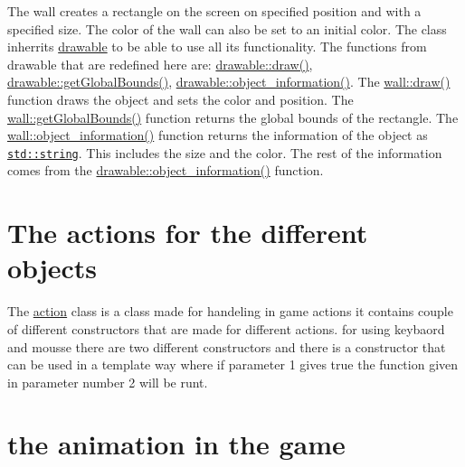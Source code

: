 The wall creates a rectangle on the screen on specified position and with a specified size. The color of the wall can also be set to an initial color. The class inherrits \hyperlink{classdrawable}{drawable} to be able to use all its functionality. The functions from drawable that are redefined here are\+: \hyperlink{classdrawable_a4e49e2c1121704c83ce24c5f48dd910f}{drawable\+::draw()}, \hyperlink{classdrawable_ae013ac0be47538be9ce885d6642daf73}{drawable\+::get\+Global\+Bounds()}, \hyperlink{classdrawable_a2ed0f8bb53f33477f7722efa7bb24583}{drawable\+::object\+\_\+information()}. The \hyperlink{classwall_aa25b8377e1d9a209fabd2271294f05d0}{wall\+::draw()} function draws the object and sets the color and position. The \hyperlink{classwall_a317a464c879cfdf9464bd6f1b62d9101}{wall\+::get\+Global\+Bounds()} function returns the global bounds of the rectangle. The \hyperlink{classwall_aab1de4f144f176b134a967ba08747932}{wall\+::object\+\_\+information()} function returns the information of the object as \href{http://www.cplusplus.com/reference/string/string/string/}{\tt std\+::string}. This includes the size and the color. The rest of the information comes from the \hyperlink{classdrawable_a2ed0f8bb53f33477f7722efa7bb24583}{drawable\+::object\+\_\+information()} function.\hypertarget{index_actions}{}\section{The actions for the different objects}\label{index_actions}
The \hyperlink{classaction}{action} class is a class made for handeling in game actions it contains couple of different constructors that are made for different actions. for using keybaord and mousse there are two different constructors and there is a constructor that can be used in a template way where if parameter 1 gives true the function given in parameter number 2 will be runt.\hypertarget{index_animation}{}\section{the animation in the game}\label{index_animation}
